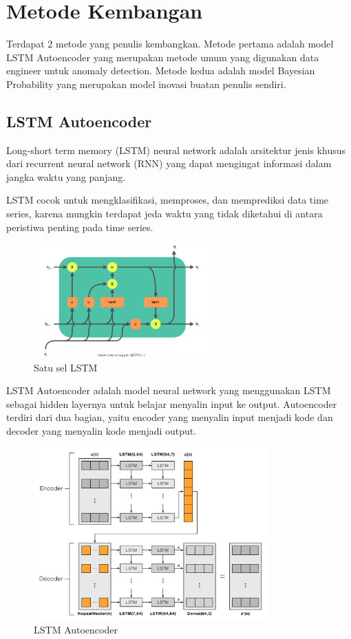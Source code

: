 \chapter{Metode Kembangan}

Terdapat 2 metode yang penulis kembangkan. Metode pertama adalah model LSTM Autoencoder yang merupakan metode umum yang digunakan data engineer untuk anomaly detection. Metode kedua adalah model Bayesian Probability yang merupakan model inovasi buatan penulis sendiri.

\section{LSTM Autoencoder}

Long-short term memory (LSTM) neural network adalah arsitektur jenis khusus dari recurrent neural network (RNN) yang dapat mengingat informasi dalam jangka waktu yang panjang.

LSTM cocok untuk mengklasifikasi, memproses, dan memprediksi data time series, karena mungkin terdapat jeda waktu yang tidak diketahui di antara peristiwa penting pada time series.

\begin{figure}[h]
    \centering
    \includegraphics[width=0.6\textwidth]{resources/LSTM/LSTM_cell.png}
    \caption{Satu sel LSTM}
\end{figure}

LSTM Autoencoder adalah model neural network yang menggunakan LSTM sebagai hidden layernya untuk belajar menyalin input ke output. Autoencoder terdiri dari dua bagian, yaitu encoder yang menyalin input menjadi kode dan decoder yang menyalin kode menjadi output.

\begin{figure}[h]
    \centering
    \includegraphics[width=0.8\textwidth]{resources/LSTM/lstm_ae.png}
    \caption{LSTM Autoencoder}
\end{figure}

